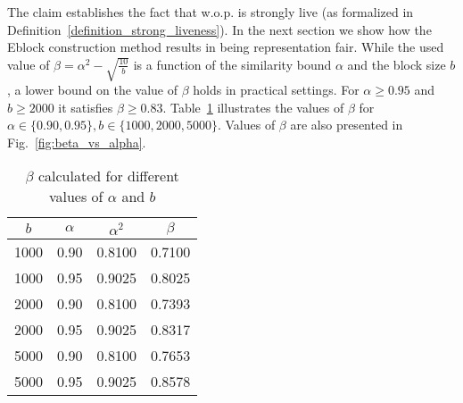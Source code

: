 The claim establishes the fact that w.o.p. \name is strongly live (as formalized in Definition~\ref{definition_strong_liveness}).
In the next section we show how the Eblock construction method results in \name being representation fair.
While the used value of $\beta = \alpha^2-\sqrt{\frac{10}{b}}$ is a function of the similarity bound $\alpha$ and the block size $b$, a lower bound on the value of $\beta$ holds in practical settings.
For $\alpha \ge 0.95$ and $b \ge 2000$ it satisfies $\beta \ge 0.83$. 
Table~\ref{tab:table1} illustrates the values of $\beta$ for $\alpha \in \{0.90,0.95\}, b \in \{1000,2000,5000\}$. Values of $\beta$ are also presented 
in Fig.~\ref{fig:beta_vs_alpha}.  
 

\begin{table}[h!]
  \begin{center}
    \caption{$\beta$ calculated for different values of $\alpha$ and $b$}
    \label{tab:table1}
    \begin{tabular}{c|c|c|c} %
      $b$ & $\alpha$ &$\alpha ^2$ &  $\beta$ \\
      \hline
      1000&0.90 &0.8100&0.7100\\
      1000&0.95 &0.9025&0.8025\\
      2000&0.90 & 0.8100 & 0.7393\\
      2000&0.95 &0.9025&0.8317\\
      5000&0.90 & 0.8100 & 0.7653\\
      5000&0.95 &0.9025&0.8578\\
    \end{tabular}
  \end{center}
\end{table}


